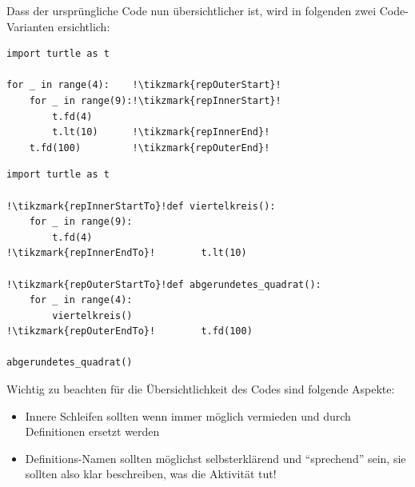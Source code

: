 \begin{myexample}
Dass der ursprüngliche Code nun übersichtlicher ist, wird in folgenden zwei Code-Varianten ersichtlich:

\begin{center}
\begin{minipage}{.4\textwidth}
\begin{lstlisting}[escapechar=!]
import turtle as t

for _ in range(4):    !\tikzmark{repOuterStart}!
    for _ in range(9):!\tikzmark{repInnerStart}!
        t.fd(4)
        t.lt(10)      !\tikzmark{repInnerEnd}!
    t.fd(100)         !\tikzmark{repOuterEnd}!
\end{lstlisting}
\end{minipage}\hfill\begin{minipage}{.4\textwidth}
\begin{lstlisting}[escapechar=!]
import turtle as t

!\tikzmark{repInnerStartTo}!def viertelkreis():
    for _ in range(9):
        t.fd(4)
!\tikzmark{repInnerEndTo}!        t.lt(10)

!\tikzmark{repOuterStartTo}!def abgerundetes_quadrat():
    for _ in range(4):
        viertelkreis()
!\tikzmark{repOuterEndTo}!        t.fd(100)

abgerundetes_quadrat()
\end{lstlisting}
\end{minipage}
\end{center}

Wichtig zu beachten für die Übersichtlichkeit des Codes sind folgende Aspekte:
\begin{itemize}
\item Innere Schleifen sollten wenn immer möglich vermieden und durch Definitionen ersetzt werden
\item Definitions-Namen sollten möglichst selbsterklärend und ``sprechend'' sein, sie sollten also klar beschreiben, was die Aktivität tut! %
\end{itemize}
\end{myexample}

